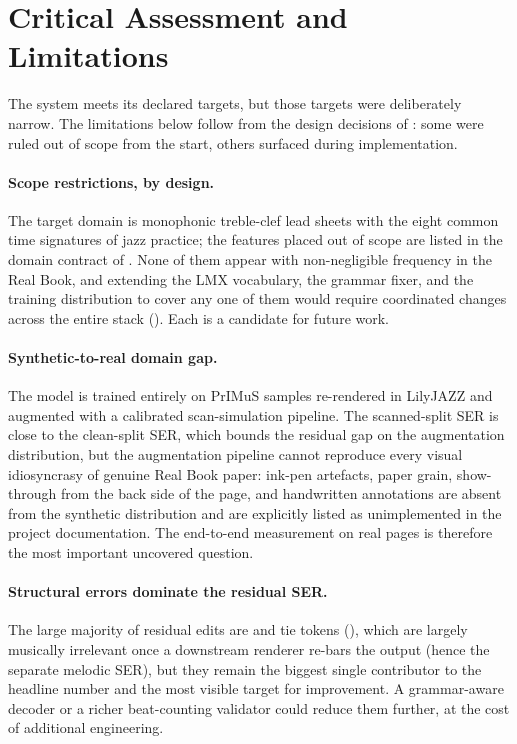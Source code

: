 \section{Critical Assessment and Limitations}
\label{sec:conc-limitations}

The system meets its declared targets, but those targets were
deliberately narrow.
The limitations below follow from the design decisions of
: some were ruled out of scope from the start,
others surfaced during implementation.

\paragraph{Scope restrictions, by design.}
The target domain is monophonic treble-clef lead sheets with the
eight common time signatures of jazz practice; the features placed
out of scope are listed in the domain contract of
.
None of them appear with non-negligible frequency in the Real Book,
and extending the LMX vocabulary, the grammar fixer, and the training
distribution to cover any one of them would require coordinated
changes across the entire stack
().
Each is a candidate for future work.

\paragraph{Synthetic-to-real domain gap.}
The model is trained entirely on PrIMuS samples re-rendered in
LilyJAZZ and augmented with a calibrated scan-simulation pipeline.
The scanned-split SER is close to the clean-split SER, which bounds
the residual gap on the augmentation distribution, but the
augmentation pipeline cannot reproduce every visual idiosyncrasy of
genuine Real Book paper: ink-pen artefacts, paper grain, show-through
from the back side of the page, and handwritten annotations are
absent from the synthetic distribution and are explicitly listed as
unimplemented in the project documentation.
The end-to-end measurement on real pages is therefore the most
important uncovered question.

\paragraph{Structural errors dominate the residual SER.}
The large majority of residual edits are  and tie tokens
(), which are largely musically irrelevant once a
downstream renderer re-bars the output (hence the separate melodic
SER), but they remain the biggest single contributor to the headline
number and the most visible target for improvement.
A grammar-aware decoder or a richer beat-counting validator could
reduce them further, at the cost of additional engineering.


